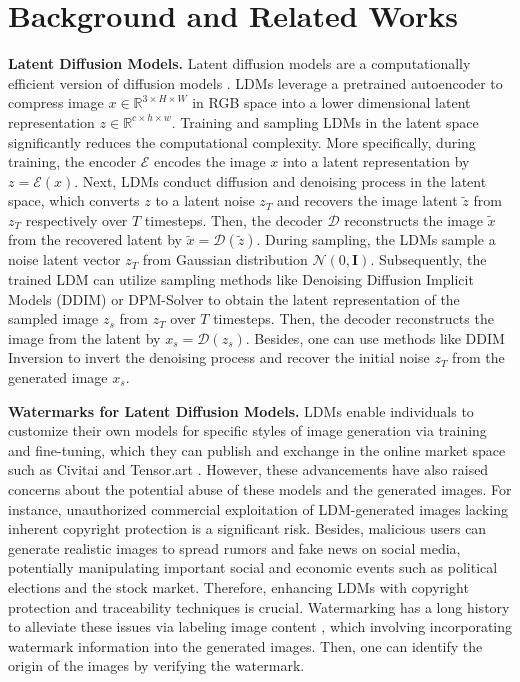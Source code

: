 \section{Background and Related Works}

\textbf{Latent Diffusion Models.} Latent diffusion models are a computationally efficient version of diffusion models \cite{rombach2022high}. LDMs leverage a pretrained autoencoder to compress image $x\in \mathbb{R}^{3 \times H \times W}$ in RGB space into a lower dimensional latent representation $z \in \mathbb{R}^{c \times h \times w}$. Training and sampling LDMs in the latent space significantly reduces the computational complexity. More specifically, during training, the encoder $\mathcal{E}$ encodes the image $ x $ into a latent representation by $z = \mathcal{E}(x)$. Next, LDMs conduct diffusion and denoising process in the latent space, which converts $z$ to a latent noise $z_T$ and recovers the image latent $\tilde{z}$  from $z_T$ respectively over  $T$ timesteps. Then,  the decoder $\mathcal{D}$ reconstructs the image $\tilde{x}$  from the recovered latent by $\tilde{x} = \mathcal{D}(\tilde{z})$. During sampling, the LDMs sample a noise latent vector $z_T$ from Gaussian distribution \(\mathcal{N}(0, \mathbf{I})\). Subsequently, the trained LDM can utilize sampling methods like Denoising Diffusion Implicit Models (DDIM) \cite{song2020denoising, nichol2021improved} or DPM-Solver \cite{lu2022dpm} to obtain the latent representation of the sampled image $z_s$ from $z_T$ over $T$ timesteps. Then,  the decoder reconstructs the image from the latent by $x_s=\mathcal{D}\left(z_s\right)$. Besides, one can use methods like DDIM Inversion \cite{dimm_inversion} to invert the denoising process and recover the initial noise $z_T$ from the generated image $x_s$. 

\noindent \textbf{Watermarks for Latent Diffusion Models.} LDMs enable individuals to customize their own models for specific styles of image generation via training and fine-tuning, which they can publish and exchange in the online market space such as Civitai \cite{civitai} and Tensor.art \cite{tensorart}. However, these advancements have also raised concerns about the potential abuse of these models and the generated images. For instance, unauthorized commercial exploitation of LDM-generated images lacking inherent copyright protection is a significant risk. Besides, malicious users can generate realistic images to spread rumors and fake news on social media, potentially manipulating important social and economic events such as political elections and the stock market. Therefore, enhancing LDMs with copyright protection and traceability techniques is crucial. Watermarking has a long history to alleviate these issues via labeling image content \cite{Ruanaidh_Dowling_Boland_1996}, which involving incorporating watermark information into the generated images. Then, one can identify the origin of the images by verifying the watermark. 

